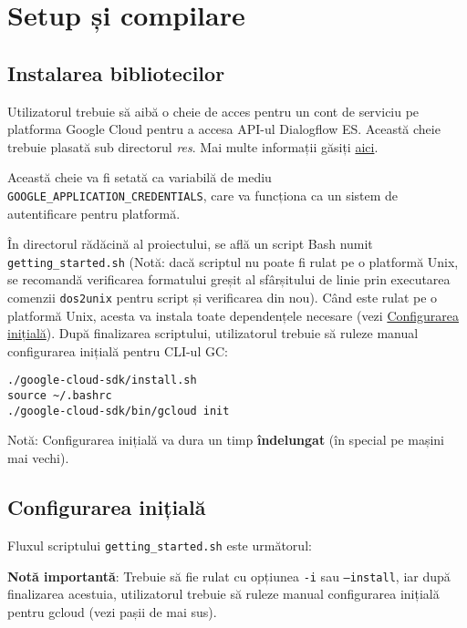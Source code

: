 \chapter{Setup și compilare}

\section{Instalarea bibliotecilor}
Utilizatorul trebuie să aibă o cheie de acces pentru un cont de serviciu pe platforma Google Cloud pentru a accesa API-ul Dialogflow ES. Această cheie trebuie plasată sub directorul \emph{res}. Mai multe informații găsiți \href{https://cloud.google.com/iam/docs/keys-create-delete}{aici}.

Această cheie va fi setată ca variabilă de mediu \texttt{GOOGLE\_APPLICATION\_CREDENTIALS}, care va funcționa ca un sistem de autentificare pentru platformă.

În directorul rădăcină al proiectului, se află un script Bash numit \texttt{getting\_started.sh} (Notă: dacă scriptul nu poate fi rulat pe o platformă Unix, se recomandă verificarea formatului greșit al sfârșitului de linie prin executarea comenzii \texttt{dos2unix} pentru script și verificarea din nou). Când este rulat pe o platformă Unix, acesta va instala toate dependențele necesare (vezi \hyperref[first-time-setup]{Configurarea inițială}). După finalizarea scriptului, utilizatorul trebuie să ruleze manual configurarea inițială pentru CLI-ul GC:

\begin{verbatim}
./google-cloud-sdk/install.sh
source ~/.bashrc
./google-cloud-sdk/bin/gcloud init
\end{verbatim}

Notă: Configurarea inițială va dura un timp \textbf{îndelungat} (în special pe mașini mai vechi).

\section{Configurarea inițială}
Fluxul scriptului \texttt{getting\_started.sh} este următorul:

\textbf{Notă importantă}: Trebuie să fie rulat cu opțiunea \texttt{-i} sau \texttt{--install}, iar după finalizarea acestuia, utilizatorul trebuie să ruleze manual configurarea inițială pentru gcloud (vezi pașii de mai sus).

